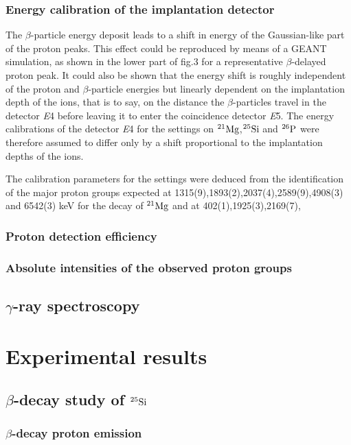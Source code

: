 \documentclass[UTF8]{ctexart}
\begin{document}
\subsubsection{Energy calibration of the implantation detector}
The $\beta$-particle energy deposit leads to a shift in energy of the Gaussian-like part of the proton peaks. This effect could be reproduced by means of a GEANT simulation, as shown in the lower part of fig.3 for a representative $\beta$-delayed proton peak. It could also be shown that the energy shift is roughly independent of the proton and $\beta$-particle energies but linearly dependent on the implantation depth of the ions, that is to say, on the distance the $\beta$-particles travel in the detector \textit{E}4 before leaving it to enter the coincidence detector \textit{E}5. The energy calibrations of the detector \textit{E}4 for the settings on $^{21}\textnormal{Mg}$,$^{25}\textnormal{Si}$ and $^{26}\textnormal{P}$ were therefore assumed to differ only by a shift proportional to the implantation depths of the ions.

The calibration parameters for the settings were deduced from the identification of the major proton groups expected at 1315(9),1893(2),2037(4),2589(9),4908(3) and 6542(3) keV for the decay of $^{21}\textnormal{Mg}$ and at 402(1),1925(3),2169(7),

\subsubsection{Proton detection efficiency}
\subsubsection{Absolute intensities of the observed proton groups}
\subsection{$\gamma$-ray spectroscopy}
\section{Experimental results}
\subsection{$\beta$-decay study of $^{25}\textnormal{Si}$}
\subsubsection{$\beta$-decay proton emission}
\end{document}
